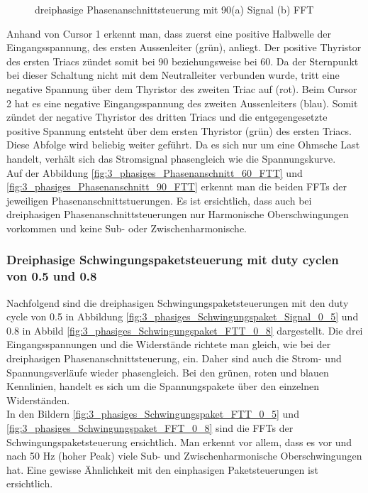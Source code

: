 \begin{figure}[ht!]
	\centering
	\qquad
	\caption{dreiphasige Phasenanschnittsteuerung mit 90\textdegree (a) Signal (b) FFT}
	\label{fig:dreiphasige_Phasenanschnittsteuerung_mit_90}
\end{figure}
Anhand von Cursor 1 erkennt man, dass zuerst eine positive Halbwelle der Eingangsspannung, des ersten Aussenleiter (grün), anliegt. Der positive Thyristor des ersten Triacs zündet somit bei 90\textdegree\hspace{0.02cm} beziehungsweise bei 60\textdegree\hspace{0.02cm}. Da der Sternpunkt bei dieser Schaltung nicht mit dem Neutralleiter verbunden wurde, tritt eine negative Spannung über dem Thyristor des zweiten Triac auf (rot). Beim Cursor 2 hat es eine negative Eingangsspannung des zweiten Aussenleiters (blau). Somit zündet der negative Thyristor des dritten Triacs und die entgegengesetzte positive Spannung entsteht über dem ersten Thyristor (grün) des ersten Triacs. Diese Abfolge wird beliebig weiter geführt. Da es sich nur um eine Ohmsche Last handelt, verhält sich das Stromsignal phasengleich wie die Spannungskurve.\\
Auf der Abbildung \ref{fig:3_phasiges_Phasenanschnitt_60_FTT} und \ref{fig:3_phasiges_Phasenanschnitt_90_FTT} erkennt man die beiden  FFTs der jeweiligen Phasenanschnittstuerungen. Es ist ersichtlich, dass auch bei dreiphasigen Phasenanschnittsteuerungen nur Harmonische Oberschwingungen vorkommen und keine Sub- oder Zwischenharmonische. 

\newpage

\subsubsection{Dreiphasige Schwingungspaketsteuerung mit duty cyclen von 0.5 und 0.8}\label{sec:Schwingungspaketsteuerung_Simulation}
Nachfolgend sind die dreiphasigen Schwingungspaketsteuerungen mit den duty cycle von 0.5 in Abbildung \ref{fig:3_phasiges_Schwingungspaket_Signal_0_5} und 0.8 in Abbild \ref{fig:3_phasiges_Schwingungspaket_FTT_0_8} dargestellt. Die drei Eingangsspannungen und die Widerstände richtete man gleich, wie bei der dreiphasigen Phasenanschnittsteuerung, ein. Daher sind auch die Strom- und Spannungsverläufe wieder phasengleich. Bei den grünen, roten und blauen Kennlinien, handelt es sich um die Spannungspakete über den einzelnen Widerständen.\\
In den Bildern \ref{fig:3_phasiges_Schwingungspaket_FTT_0_5} und \ref{fig:3_phasiges_Schwingungspaket_FFT_0_8} sind die FFTs der Schwingungspaketsteuerung ersichtlich. Man erkennt vor allem, dass es vor und nach 50 Hz (hoher Peak) viele Sub- und Zwischenharmonische Oberschwingungen hat. Eine gewisse Ähnlichkeit mit den einphasigen Paketsteuerungen ist ersichtlich.
 

